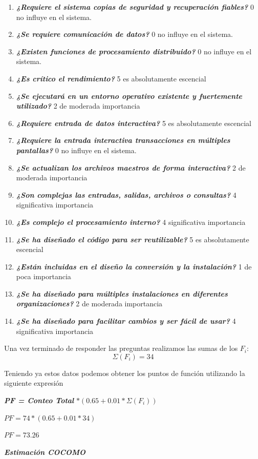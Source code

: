 \begin{enumerate}
    \item \textit{\textbf{¿Requiere el sistema copias de seguridad y recuperación fiables?}} 0 no influye en el sistema. 
    \item \textit{\textbf{¿Se requiere comunicación de datos?}} 0 no influye en el sistema.     
    \item \textit{\textbf{¿Existen funciones de procesamiento distribuido?}} 0 no influye en el sistema.     
    \item \textit{\textbf{¿Es crítico el rendimiento?}} 5 es absolutamente escencial     
    \item \textit{\textbf{¿Se ejecutará en un entorno operativo existente y fuertemente utilizado?}} 2 de moderada importancia     
    \item \textit{\textbf{¿Requiere entrada de datos interactiva?}} 5 es absolutamente escencial     
    \item \textit{\textbf{¿Requiere la entrada interactiva transacciones en múltiples pantallas?}} 0 no influye en el sistema.     
    \item \textit{\textbf{¿Se actualizan los archivos maestros de forma interactiva?}} 2 de moderada importancia     
    \item \textit{\textbf{¿Son complejas las entradas, salidas, archivos o consultas?}} 4 significativa importancia     
    \item \textit{\textbf{¿Es complejo el procesamiento interno?}} 4 significativa importancia     
    \item \textit{\textbf{¿Se ha diseñado el código para ser reutilizable?}} 5 es absolutamente escencial  
    \item \textit{\textbf{¿Están incluidas en el diseño la conversión y la instalación?}} 1 de poca importancia     
    \item \textit{\textbf{¿Se ha diseñado para múltiples instalaciones en diferentes organizaciones?}} 2 de moderada importancia     
    \item \textit{\textbf{¿Se ha diseñado para facilitar cambios y ser fácil de usar?}} 4 significativa importancia 
\end{enumerate}

Una vez terminado de responder las preguntas realizamos las sumas de los $F_{i}:$
\[\Sigma (F_{i}) = 34\]

Teniendo ya estos datos podemos obtener los puntos de función utilizando la siguiente expresión  
\begin{center}
    \textit{\textbf{PF = Conteo Total }}$* (0.65 + 0.01 * \Sigma (F_{i}))$

    $PF = 74 * (0.65 + 0.01 * 34)$
    
    $PF = 73.26$
\end{center}
\newpage
\textit{\textbf{Estimación COCOMO}} 

